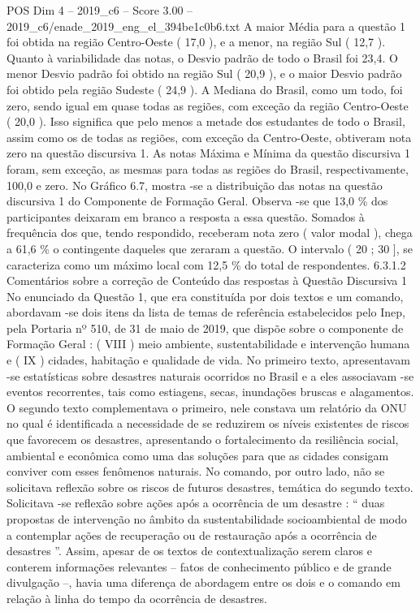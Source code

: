 \begin{textsample}{POS Dim 4 – 2019\_c6 – Score 3.00 – 2019\_c6/enade\_2019\_eng\_el\_394be1c0b6.txt}
A maior Média para a questão 1 foi obtida na região Centro-Oeste ( 17,0 ), e a menor, na região Sul ( 12,7 ).
Quanto à variabilidade das notas, o Desvio padrão de todo o Brasil foi 23,4.
O menor Desvio padrão foi obtido na região Sul ( 20,9 ), e o maior Desvio padrão foi obtido pela região Sudeste ( 24,9 ).
A Mediana do Brasil, como um todo, foi zero, sendo igual em quase todas as regiões, com exceção da região Centro-Oeste ( 20,0 ).
Isso significa que pelo menos a metade dos estudantes de todo o Brasil, assim como os de todas as regiões, com exceção da Centro-Oeste, obtiveram nota zero na questão discursiva 1.
As notas Máxima e Mínima da questão discursiva 1 foram, sem exceção, as mesmas para todas as regiões do Brasil, respectivamente, 100,0 e zero.
No Gráfico 6.7, mostra -se a distribuição das notas na questão discursiva 1 do Componente de Formação Geral.
Observa -se que 13,0 \% dos participantes deixaram em branco a resposta a essa questão.
Somados à frequência dos que, tendo respondido, receberam nota zero ( valor modal ), chega a 61,6 \% o contingente daqueles que zeraram a questão.
O intervalo ( 20 ; 30 ], se caracteriza como um máximo local com 12,5 \% do total de respondentes. 6.3.1.2 Comentários sobre a correção de Conteúdo das respostas à Questão Discursiva 1 No enunciado da Questão 1, que era constituída por dois textos e um comando, abordavam -se dois itens da lista de temas de referência estabelecidos pelo Inep, pela Portaria nº 510, de 31 de maio de 2019, que dispõe sobre o componente de Formação Geral : ( VIII ) meio ambiente, sustentabilidade e intervenção humana e ( IX ) cidades, habitação e qualidade de vida.
No primeiro texto, apresentavam -se estatísticas sobre desastres naturais ocorridos no Brasil e a eles associavam -se eventos recorrentes, tais como estiagens, secas, inundações bruscas e alagamentos.
O segundo texto complementava o primeiro, nele constava um relatório da ONU no qual é identificada a necessidade de se reduzirem os níveis existentes de riscos que favorecem os desastres, apresentando o fortalecimento da resiliência social, ambiental e econômica como uma das soluções para que as cidades consigam conviver com esses fenômenos naturais.
No comando, por outro lado, não se solicitava reflexão sobre os riscos de futuros desastres, temática do segundo texto.
Solicitava -se reflexão sobre ações após a ocorrência de um desastre : “ duas propostas de intervenção no âmbito da sustentabilidade socioambiental de modo a contemplar ações de recuperação ou de restauração após a ocorrência de desastres ”.
Assim, apesar de os textos de contextualização serem claros e conterem informações relevantes – fatos de conhecimento público e de grande divulgação –, havia uma diferença de abordagem entre os dois e o comando em relação à linha do tempo da ocorrência de desastres.

\end{textsample}
